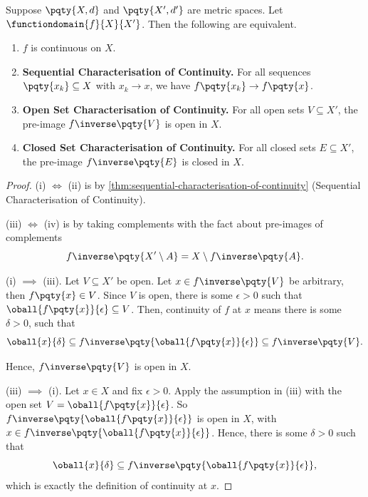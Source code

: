 \begin{theorem}
    \label{thm:characterisation-of-continuity}%
    Suppose \(\pqty{X, d}\) and \(\pqty{X', d'}\) are metric spaces. Let \(\functiondomain{f}{X}{X'}\). Then the following are equivalent.
    \begin{enumerate}[label=(\roman*)]
        \item \(f\) is continuous on \(X\).
        \item \textbf{Sequential Characterisation of Continuity.} For all sequences \(\pqty{x_k} \subseteq X\) with \(x_k \to x\), we have \(f\pqty{x_k} \to f\pqty{x}\).
        \item \textbf{Open Set Characterisation of Continuity.} For all open sets \(V \subseteq X'\), the pre-image \(f\inverse\pqty{V}\) is open in \(X\).
        \item \textbf{Closed Set Characterisation of Continuity.} For all closed sets \(E \subseteq X'\), the pre-image \(f\inverse\pqty{E}\) is closed in \(X\).
    \end{enumerate}
\end{theorem}

\begin{proof}
    (i) \(\iff\) (ii) is by \autoref{thm:sequential-characterisation-of-continuity} (Sequential Characterisation of Continuity).

    (iii) \(\iff\) (iv) is by taking complements with the fact about pre-images of complements
    \[
        f\inverse\pqty{X' \setminus A} = X \setminus f\inverse\pqty{A}.
    \]

    (i) \(\implies\) (iii). Let \(V \subseteq X'\) be open. Let \(x \in f\inverse\pqty{V}\) be arbitrary, then \(f\pqty{x} \in V\). Since \(V\) is open, there is some \(\epsilon > 0\) such that \(\oball{f\pqty{x}}{\epsilon} \subseteq V\). Then, continuity of \(f\) at \(x\) means there is some \(\delta > 0\), such that
    \[
        \oball{x}{\delta} \subseteq f\inverse\pqty{\oball{f\pqty{x}}{\epsilon}} \subseteq f\inverse\pqty{V}.
    \]

    Hence, \(f\inverse\pqty{V}\) is open in \(X\).

    (iii) \(\implies\) (i). Let \(x \in X\) and fix \(\epsilon > 0\). Apply the assumption in (iii) with the open set \(V = \oball{f\pqty{x}}{\epsilon}\). So \(f\inverse\pqty{\oball{f\pqty{x}}{\epsilon}}\) is open in \(X\), with \(x \in f\inverse\pqty{\oball{f\pqty{x}}{\epsilon}}\). Hence, there is some \(\delta > 0\) such that
    \[
        \oball{x}{\delta} \subseteq f\inverse\pqty{\oball{f\pqty{x}}{\epsilon}},
    \]
    which is exactly the definition of continuity at \(x\).
\end{proof}

